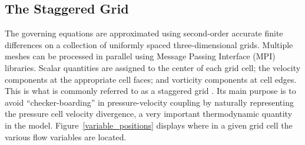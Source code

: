 \subsection{The Staggered Grid}
\label{sec:staggered_grid}

The governing equations are approximated using second-order accurate finite differences on a collection of uniformly spaced three-dimensional grids. Multiple meshes can be processed in parallel using Message Passing Interface (MPI) libraries. Scalar quantities are assigned to the center of each grid cell; the velocity components at the appropriate cell faces; and vorticity components at cell edges. This is what is commonly referred to as a staggered grid \cite{Harlow:1,Morinishi}.  Its main purpose is to avoid ``checker-boarding'' in pressure-velocity coupling by naturally representing the pressure cell velocity divergence, a very important thermodynamic quantity in the model. Figure~\ref{variable_positions} displays where in a given grid cell the various flow variables are located.

